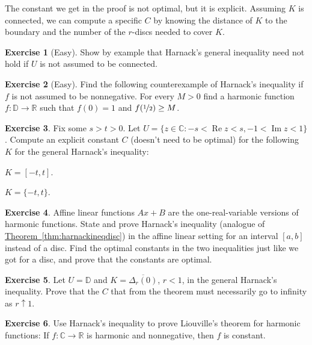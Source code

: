 \documentclass[12pt,openany]{book}
\renewcommand{\Re}{\operatorname{Re}}
\renewcommand{\Im}{\operatorname{Im}}
\newcommand{\C}{{\mathbb{C}}}
\newcommand{\R}{{\mathbb{R}}}
\newcommand{\D}{{\mathbb{D}}}
\theoremstyle{plain}
\theoremstyle{remark}
\theoremstyle{definition}
\newenvironment{exbox}{%
    \def\FrameCommand{\vrule width 1pt \relax\hspace{10pt}}%
    \MakeFramed{\advance\hsize-\width\FrameRestore}%
}{%
    \endMakeFramed
}
\newenvironment{expartshor}[1]{%
    \begingroup%
    \NumTabs{#1}%
    \leavevmode%
    \par%
    \begin{enumerate*}[a),itemjoin={\tab}]
}{%
    \end{enumerate*}\endgroup\par
}
\theoremstyle{exercise}
\newtheorem{exercise}{Exercise}[section]
\theoremstyle{example}
\newcommand{\thmref}[1]{\hyperref[#1]{Theorem~\ref*{#1}}}
\begin{document}
The constant we get in the proof is not optimal, but it is explicit.
Assuming $K$ is connected,
we can compute a specific $C$ by knowing the distance of $K$
to the boundary and the number of the $r$-discs needed to cover $K$.

\begin{exbox}
\begin{exercise}[Easy]
Show by example that Harnack's general inequality need not hold if $U$
is not assumed to be connected.
\end{exercise}

\begin{exercise}[Easy]
Find the following counterexample of Harnack's inequality
if $f$ is not assumed to be
nonnegative.  For every $M > 0$ find
a harmonic function $f \colon \D \to \R$ such that $f(0) = 1$ and
$f(\nicefrac{1}{2}) \geq M$.
\end{exercise}

\begin{exercise}
Fix some $s > t > 0$.
Let $U = \{z \in \C : -s < \Re z < s, -1 < \Im z < 1 \}$.
Compute an explicit constant $C$
(doesn't need to be optimal)
for the following $K$ for the general
Harnack's inequality:
\smallskip
\begin{expartshor}{2}
\item
$K = [-t,t]$.
\item
$K = \{-t,t\}$.
\end{expartshor}
\end{exercise}

\begin{exercise}
Affine linear functions $Ax+B$ are the one-real-variable
versions of harmonic functions.  State and prove Harnack's inequality
(analogue of \thmref{thm:harnackineqdisc})
in the affine linear setting for an interval $[a,b]$ instead of a disc.
Find the optimal constants in the two inequalities just like we got for a disc,
and prove that the constants are optimal.
\end{exercise}

\begin{exercise}
Let $U = \D$ and $K=\overline{\Delta_r(0)}$, $r < 1$, in the general 
Harnack's inequality.  Prove that the $C$ that from the theorem
must necessarily go to infinity as $r \uparrow 1$.
\end{exercise}

\begin{exercise}
Use Harnack's inequality to prove Liouville's theorem
for harmonic functions:
If $f \colon \C \to \R$ is harmonic
and nonnegative, then $f$ is constant.
\end{exercise}
\end{exbox}
\end{document}
